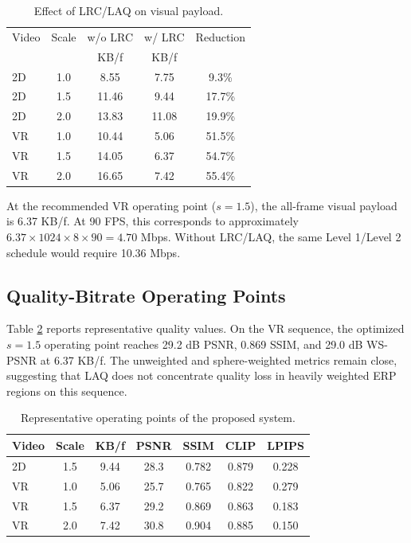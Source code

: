 \documentclass[conference]{IEEEtran}
\begin{document}
\begin{table}[t]
\caption{Effect of LRC/LAQ on visual payload.}

\label{tab:lrc}
\centering
\footnotesize
\begin{tabular}{lcccc}
\toprule
Video & Scale & w/o LRC & w/ LRC & Reduction \\
 & & KB/f & KB/f & \\
\midrule
2D & 1.0 & 8.55 & 7.75 & 9.3\% \\
2D & 1.5 & 11.46 & 9.44 & 17.7\% \\
2D & 2.0 & 13.83 & 11.08 & 19.9\% \\
VR & 1.0 & 10.44 & 5.06 & 51.5\% \\
VR & 1.5 & 14.05 & 6.37 & 54.7\% \\
VR & 2.0 & 16.65 & 7.42 & 55.4\% \\
\bottomrule
\end{tabular}
\end{table}

At the recommended VR operating point ($s=1.5$), the all-frame visual payload is 6.37 KB/f. At 90 FPS, this corresponds to approximately $6.37\times1024\times8\times90 = 4.70$ Mbps. Without LRC/LAQ, the same Level 1/Level 2 schedule would require 10.36 Mbps.

\subsection{Quality-Bitrate Operating Points}

Table \ref{tab:quality} reports representative quality values. On the VR sequence, the optimized $s=1.5$ operating point reaches 29.2 dB PSNR, 0.869 SSIM, and 29.0 dB WS-PSNR at 6.37 KB/f. The unweighted and sphere-weighted metrics remain close, suggesting that LAQ does not concentrate quality loss in heavily weighted ERP regions on this sequence.

\begin{table}[t]
\caption{Representative operating points of the proposed system.}
\label{tab:quality}
\centering
\footnotesize
\begin{tabular}{lcccccc}
\toprule
Video & Scale & KB/f & PSNR & SSIM & CLIP & LPIPS \\
\midrule
2D & 1.5 & 9.44 & 28.3 & 0.782 & 0.879 & 0.228 \\
VR & 1.0 & 5.06 & 25.7 & 0.765 & 0.822 & 0.279 \\
VR & 1.5 & 6.37 & 29.2 & 0.869 & 0.863 & 0.183 \\
VR & 2.0 & 7.42 & 30.8 & 0.904 & 0.885 & 0.150 \\
\bottomrule
\end{tabular}
\end{table}
\end{document}

